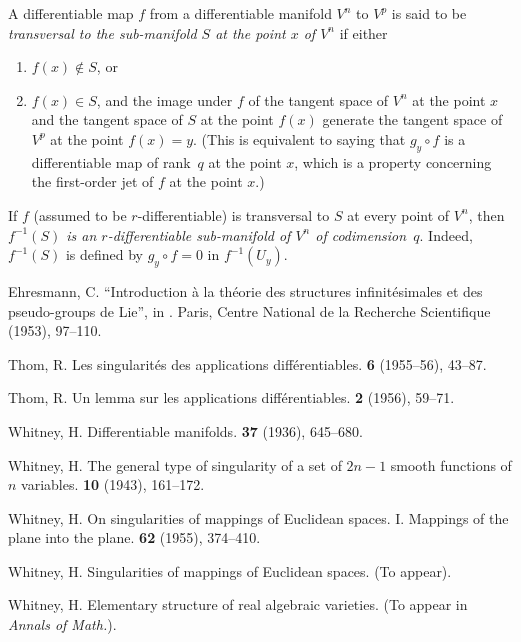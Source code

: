 \documentclass{article}
\theoremstyle{plain}
\theoremstyle{definition}
\begin{document}
A differentiable map $f$ from a differentiable manifold $V^n$ to $V^p$ is said to be \emph{transversal to the sub-manifold $S$ at the point $x$ of $V^n$} if either
\begin{enumerate}
  \item $f(x)\not\in S$, or
  \item $f(x)\in S$, and the image under $f$ of the tangent space of $V^n$ at the point $x$ and the tangent space of $S$ at the point $f(x)$ generate the tangent space of $V^p$ at the point $f(x)=y$.
    (This is equivalent to saying that $g_y\circ f$ is a differentiable map of rank~$q$ at the point $x$, which is a property concerning the first-order jet of $f$ at the point $x$.)
\end{enumerate}

If $f$ (assumed to be $r$-differentiable) is transversal to $S$ at every point of $V^n$, then \emph{$f^{-1}(S)$ is an $r$-differentiable sub-manifold of $V^n$ of codimension~$q$}.
Indeed, $f^{-1}(S)$ is defined by $g_y\circ f=0$ in $f^{-1}(U_y)$.





\nocite{*}

\begin{thebibliography}{1}

  {\sc Ehresmann, C.}
  \newblock ``Introduction \`{a} la th\'{e}orie des structures infinit\'{e}simales et des pseudo-groups de Lie'', in
  .
  \newblock Paris, Centre National de la Recherche Scientifique (1953), 97--110.

  {\sc Thom, R.}
  \newblock Les singularit\'{e}s des applications diff\'{e}rentiables.
   \textbf{6} (1955--56), 43--87.

  {\sc Thom, R.}
  \newblock Un lemma sur les applications diff\'{e}rentiables.
   \textbf{2} (1956), 59--71.

  {\sc Whitney, H.}
  \newblock Differentiable manifolds.
   \textbf{37} (1936), 645--680.

  {\sc Whitney, H.}
  \newblock The general type of singularity of a set of $2n-1$ smooth functions of $n$ variables.
   \textbf{10} (1943), 161--172.

  {\sc Whitney, H.}
  \newblock On singularities of mappings of Euclidean spaces. I. Mappings of the plane into the plane.
   \textbf{62} (1955), 374--410.

  {\sc Whitney, H.}
  \newblock Singularities of mappings of Euclidean spaces.
  \newblock (To appear).

  {\sc Whitney, H.}
  \newblock Elementary structure of real algebraic varieties.
  \newblock (To appear in {\em Annals of Math.}).

\end{thebibliography}
\end{document}
